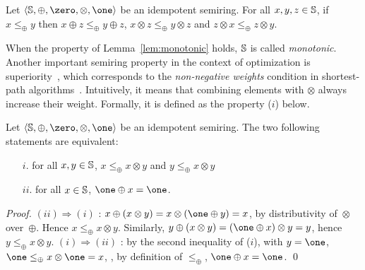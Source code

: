 \begin{lemma} \label{lem:monotonic}
Let $\< \Semiring, \oplus, \zero, \otimes, \one>$ be an idempotent semiring.
For all $x, y, z  \in \mathbb{S}$,  
if $x \leq_\oplus y$ then
$x \oplus z \leq_\oplus y \oplus z$,
$x \otimes z \leq_\oplus y \otimes z$
and $z \otimes x \leq_\oplus z \otimes y$.
\end{lemma}   
When the property of Lemma~\ref{lem:monotonic} holds, 
$\mathbb{S}$ is called  \emph{monotonic}. %
%
Another important semiring property in the context of optimization
is {superiority}~\cite{Huang08advanceddynamic}, 
which corresponds to the 
\emph{non-negative weights} condition in shortest-path algorithms~\cite{Dijkstra59anote}.
Intuitively, it means that combining elements with $\otimes$ always increase their weight. 
Formally, it is defined as the property ($i$) below. %

\begin{lemma}
\label{lem:superior}\label{lem:bounded}
Let $\< \Semiring, \oplus, \zero, \otimes, \one>$ be an idempotent semiring.
The two following statements are equivalent:
\begin{itemize}
\item [$i.$] for all $x, y \in \mathbb{S}$,  
$x \leq_\oplus x \otimes y$ and 
$y \leq_\oplus x \otimes y$
\item[$ii.$] for all $x \in \mathbb{S}$,  $\one \oplus x = \one$.
\end{itemize}
\end{lemma}
%
\begin{proof} %
$(ii) \Rightarrow (i)$ : 
$x \oplus (x \otimes y) = x \otimes (\one \oplus y) = x$, 
by distributivity of~$\otimes$ over~$\oplus$. 
Hence $x \leq_\oplus x \otimes y$.
Similarly, $y \oplus (x \otimes y) = (\one \oplus x) \otimes y = y$, 
hence $y \leq_\oplus x \otimes y$.
%
$(i) \Rightarrow (ii)$ :
by the second inequality of ($i$), with $y = \one$, 
$\one \leq_\oplus x \otimes \one = x$, \ie, 
by definition of $\leq_\oplus$, $\one \oplus x = \one$.
\qed
\end{proof}

